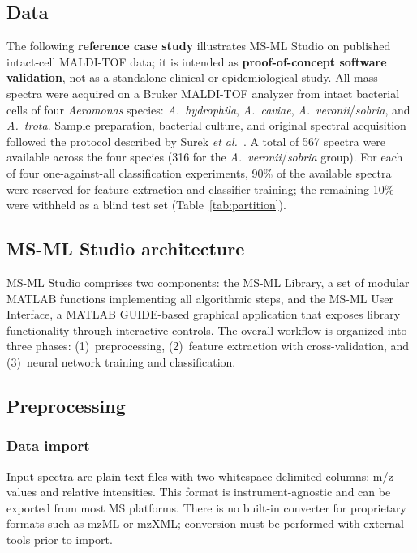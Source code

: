 \documentclass[preprint,12pt]{elsarticle}
\begin{document}
\subsection{Data}
\label{sec:data}
The following \textbf{reference case study} illustrates MS-ML Studio on published intact-cell MALDI-TOF data; it is intended as \textbf{proof-of-concept software validation}, not as a standalone clinical or epidemiological study. All mass spectra were acquired on a Bruker MALDI-TOF analyzer from intact bacterial cells of four \textit{Aeromonas} species: \textit{A.~hydrophila}, \textit{A.~caviae}, \textit{A.~veronii}/\textit{sobria}, and \textit{A.~trota}. Sample preparation, bacterial culture, and original spectral acquisition followed the protocol described by Surek \textit{et al.}~\cite{Surek2010}. A total of 567 spectra were available across the four species (316 for the \textit{A.~veronii}/\textit{sobria} group). For each of four one-against-all classification experiments, 90\% of the available spectra were reserved for feature extraction and classifier training; the remaining 10\% were withheld as a blind test set (Table~\ref{tab:partition}).

\subsection{MS-ML Studio architecture}
MS-ML Studio comprises two components: the MS-ML Library, a set of modular MATLAB functions implementing all algorithmic steps, and the MS-ML User Interface, a MATLAB GUIDE-based graphical application that exposes library functionality through interactive controls. The overall workflow is organized into three phases: (1)~preprocessing, (2)~feature extraction with cross-validation, and (3)~neural network training and classification.

\subsection{Preprocessing}

\subsubsection{Data import}
Input spectra are plain-text files with two whitespace-delimited columns: m/z values and relative intensities. This format is instrument-agnostic and can be exported from most MS platforms. There is no built-in converter for proprietary formats such as mzML or mzXML; conversion must be performed with external tools prior to import.
\end{document}
